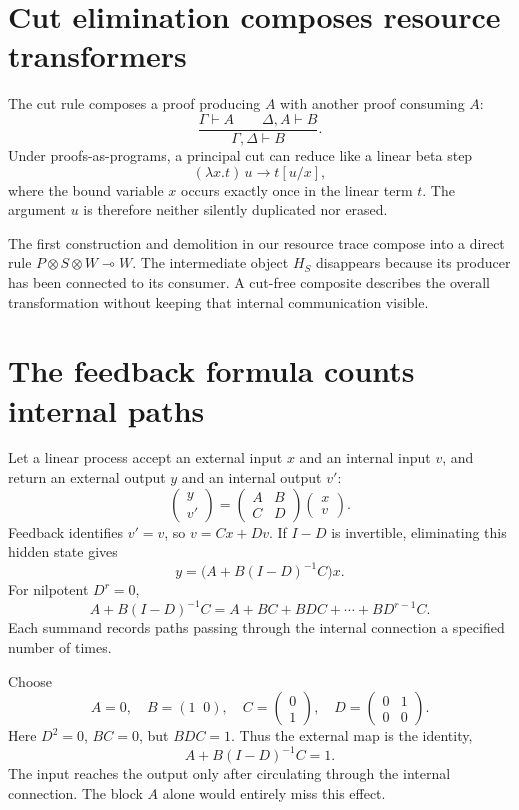 \section{Cut elimination composes resource transformers}

The cut rule composes a proof producing \(A\) with another proof consuming \(A\):
\[
 \frac{\Gamma\vdash A\qquad\Delta,A\vdash B}
      {\Gamma,\Delta\vdash B}.
\]
Under proofs-as-programs, a principal cut can reduce like a linear beta step
\[
 (\lambda x.t)\,u\longrightarrow t[u/x],
\]
where the bound variable \(x\) occurs exactly once in the linear term \(t\). The argument \(u\) is therefore neither silently duplicated nor erased.

The first construction and demolition in our resource trace compose into a direct rule \(P\otimes S\otimes W\multimap W\). The intermediate object \(H_S\) disappears because its producer has been connected to its consumer. A cut-free composite describes the overall transformation without keeping that internal communication visible.

\section{The feedback formula counts internal paths}

Let a linear process accept an external input \(x\) and an internal input \(v\), and return an external output \(y\) and an internal output \(v'\):
\[
 \begin{pmatrix}y\\v'\end{pmatrix}
 =
 \begin{pmatrix}A&B\\C&D\end{pmatrix}
 \begin{pmatrix}x\\v\end{pmatrix}.
\]
Feedback identifies \(v'=v\), so \(v=Cx+Dv\). If \(I-D\) is invertible, eliminating this hidden state gives
\[
 \boxed{y=\bigl(A+B(I-D)^{-1}C\bigr)x.}
\]
For nilpotent \(D^r=0\),
\[
 A+B(I-D)^{-1}C
 =A+BC+BDC+\cdots+BD^{r-1}C.
\]
Each summand records paths passing through the internal connection a specified number of times.

Choose
\[
 A=0,\quad B=(1\;\;0),\quad
 C=\begin{pmatrix}0\\1\end{pmatrix},\quad
 D=\begin{pmatrix}0&1\\0&0\end{pmatrix}.
\]
Here \(D^2=0\), \(BC=0\), but \(BDC=1\). Thus the external map is the identity,
\[
 A+B(I-D)^{-1}C=1.
\]
The input reaches the output only after circulating through the internal connection. The block \(A\) alone would entirely miss this effect.

